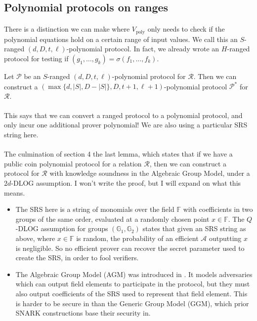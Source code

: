 \documentclass[11pt]{article}
\newcommand{\field}{\mathbb{F}}
\begin{document}
\subsection{Polynomial protocols on ranges}
\paragraph{} There is a distinction we can make where $V_\text{poly}$ only needs to check if the polynomial equations hold on a certain range of input values. We call this an $S$-ranged $(d, D, t, \ell)$-polynomial protocol. In fact, we already wrote an $H$-ranged protocol for testing if $(g_1, \ldots, g_k) = \sigma(f_1, \ldots, f_k)$.

\begin{lemma}
    Let $\mathscr{P}$ be an $S$-ranged $(d, D, t, \ell)$-polynomial protocol for $\mathcal{R}$. Then we can construct a $(\max \{ d, |S|, D - |S| \}, D, t + 1, \ell + 1)$-polynomial protocol $\mathscr{P}^*$ for $\mathcal{R}$.
\end{lemma}

\paragraph{} This says that we can convert a ranged protocol to a polynomial protocol, and only incur one additional prover polynomial! We are also using a particular SRS string here.

\paragraph{} The culmination of section 4 the last lemma, which states that if we have a public coin polynomial protocol for a relation $\mathcal{R}$, then we can construct a protocol for $\mathcal{R}$ with knowledge soundness in the Algebraic Group Model, under a $2d$-DLOG assumption. I won't write the proof, but I will expand on what this means.
\begin{itemize}
    \item The SRS here is a string of monomials over the field $\field{}$ with coefficients in two groups of the same order, evaluated at a randomly chosen point $x \in \field{}$. The $Q$-DLOG assumption for groups $(\mathbb{G}_1, \mathbb{G}_2)$ states that given an SRS string as above, where $x \in \field{}$ is random, the probability of an efficient $\mathcal{A}$ outputting $x$ is negligible. So no efficient prover can recover the secret parameter used to create the SRS, in order to fool verifiers.
    
    \item The Algebraic Group Model (AGM) was introduced in \cite{agm}. It models adversaries which can output field elements to participate in the protocol, but they must also output coefficients of the SRS used to represent that field element. This is harder to be secure in than the Generic Group Model (GGM), which prior SNARK constructions base their security in.
\end{itemize}
\end{document}
